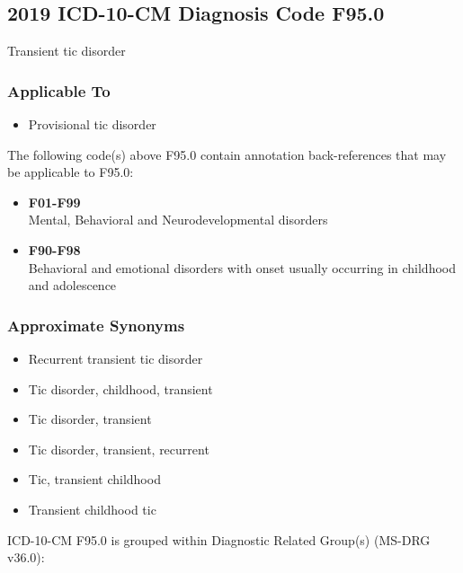 \begin{paracol}{2}
\begin{leftcolumn}
\hypertarget{icd-10-cm-diagnosis-code-f95.0}{%
\subsection{2019 ICD-10-CM Diagnosis Code F95.0}\label{icd-10-cm-diagnosis-code-f95.0}}

Transient tic disorder

\hypertarget{applicable-to}{%
\subsubsection{Applicable To}\label{applicable-to}}

\begin{itemize}
\tightlist
\item
  Provisional tic disorder
\end{itemize}

\noindent The following code(s) above F95.0 contain annotation back-references that may be applicable to F95.0:

\begin{itemize}
\tightlist
\item
  \textbf{F01-F99}\\
  Mental, Behavioral and Neurodevelopmental disorders
\item
  \textbf{F90-F98}\\
  Behavioral and emotional disorders with onset usually occurring in childhood and adolescence
\end{itemize}

\hypertarget{approximate-synonyms}{%
\subsubsection{Approximate Synonyms}\label{approximate-synonyms}}

\begin{itemize}
\tightlist
\item
  Recurrent transient tic disorder
\item
  Tic disorder, childhood, transient
\item
  Tic disorder, transient
\item
  Tic disorder, transient, recurrent
\item
  Tic, transient childhood
\item
  Transient childhood tic
\end{itemize}

\noindent ICD-10-CM F95.0 is grouped within Diagnostic Related Group(s) (MS-DRG v36.0):


\end{leftcolumn}
\end{paracol}
